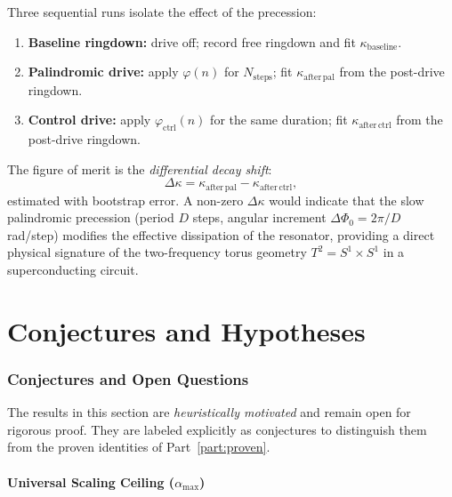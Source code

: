 \documentclass[12pt,a4paper]{article}
\theoremstyle{plain}
\theoremstyle{definition}
\theoremstyle{remark}
\begin{document}
Three sequential runs isolate the effect of the precession:
\begin{enumerate}
  \item \textbf{Baseline ringdown:} drive off; record free ringdown and fit
        $\kappa_{\mathrm{baseline}}$.
  \item \textbf{Palindromic drive:} apply $\varphi(n)$ for $N_{\mathrm{steps}}$;
        fit $\kappa_{\mathrm{after\,pal}}$ from the post-drive ringdown.
  \item \textbf{Control drive:} apply $\varphi_{\mathrm{ctrl}}(n)$ for the
        same duration; fit $\kappa_{\mathrm{after\,ctrl}}$ from the
        post-drive ringdown.
\end{enumerate}
The figure of merit is the \emph{differential decay shift}:
\begin{equation}
  \Delta\kappa
  = \kappa_{\mathrm{after\,pal}} - \kappa_{\mathrm{after\,ctrl}},
  \label{eq:delta-kappa}
\end{equation}
estimated with bootstrap error.  A non-zero $\Delta\kappa$ would indicate
that the slow palindromic precession (period $D$ steps, angular increment
$\Delta\Phi_0 = 2\pi/D$ rad/step) modifies the effective dissipation of the
resonator, providing a direct physical signature of the two-frequency torus
geometry $T^2 = S^1\times S^1$ in a superconducting circuit.

\part{Conjectures and Hypotheses}
\label{part:conjectures}

\section{Conjectures and Open Questions}
\label{sec:conjectures}

The results in this section are \emph{heuristically motivated} and remain
open for rigorous proof.  They are labeled explicitly as conjectures to
distinguish them from the proven identities of Part~\ref{part:proven}.

\subsection{Universal Scaling Ceiling
  (\texorpdfstring{$\alpha_{\max}$}{alpha\_max})}
\end{document}
